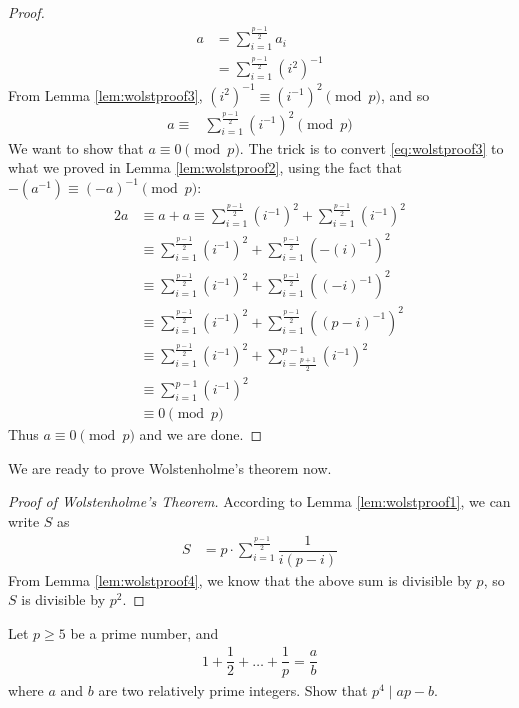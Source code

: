 \begin{proof}
			\begin{align*}
				a
					& = \sum_{i=1}^{\frac{p-1}{2}} a_i\\
					& = \sum_{i=1}^{\frac{p-1}{2}} (i^2)^{-1}
			\end{align*}
		From Lemma \ref{lem:wolstproof3},  $(i^2)^{-1} \equiv (i^{-1})^{2} \pmod p$, and so
			\begin{align}\label{eq:wolstproof3}
				a \equiv
					& \sum_{i=1}^{\frac{p-1}{2}} (i^{-1})^{2} \pmod p
			\end{align}
		We want to show that $a \equiv 0 \pmod p$. The trick is to convert \eqref{eq:wolstproof3} to what we proved in Lemma \ref{lem:wolstproof2}, using the fact that $-(a^{-1}) \equiv (-a)^{-1} \pmod p$:
			\begin{align*}
				2a
					&\equiv a+a \equiv \sum_{i=1}^{\frac{p-1}{2}} (i^{-1})^{2} + \sum_{i=1}^{\frac{p-1}{2}} (i^{-1})^{2}\\
					& \equiv \sum_{i=1}^{\frac{p-1}{2}} (i^{-1})^{2} + \sum_{i=1}^{\frac{p-1}{2}} (-(i)^{-1})^{2}  \\
					&\equiv \sum_{i=1}^{\frac{p-1}{2}} (i^{-1})^{2} + \sum_{i=1}^{\frac{p-1}{2}} ((-i)^{-1})^{2}\\
					& \equiv \sum_{i=1}^{\frac{p-1}{2}} (i^{-1})^{2} + \sum_{i=1}^{\frac{p-1}{2}} ((p-i)^{-1})^{2}\\
					& \equiv \sum_{i=1}^{\frac{p-1}{2}} (i^{-1})^{2} + \sum_{i=\frac{p+1}{2}}^{p-1} (i^{-1})^{2}\\
					& \equiv \sum_{i=1}^{p-1} (i^{-1})^{2}\\
					& \equiv 0 \pmod p
			\end{align*}
		Thus $a \equiv 0 \pmod p$ and we are done.
	\end{proof}
We are ready to prove Wolstenholme's theorem now.
	\begin{proof}[Proof of Wolstenholme's Theorem]
		According to Lemma \ref{lem:wolstproof1}, we can write $S$ as
		\begin{align*}
			S
				& = p \cdot \sum_{i=1}^{\frac{p-1}{2}} \dfrac{1}{i(p-i)}
		\end{align*}
		From Lemma \ref{lem:wolstproof4}, we know that the above sum is divisible by $p$, so $S$ is divisible by $p^2$.
	\end{proof}

	\begin{problem}
		Let $p \geq 5$ be a prime number, and
			\begin{align*}
				1 + \dfrac{1}{2} + \ldots + \dfrac{1}{p}=\dfrac{a}{b}
			\end{align*}
		where $a$ and $b$ are two relatively prime integers. Show that $p^4\mid ap-b$.
	\end{problem}

